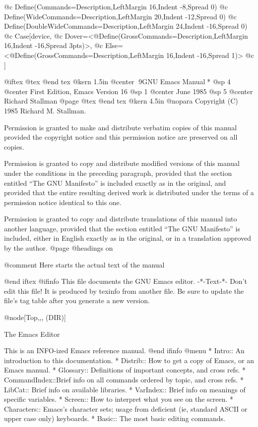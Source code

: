 @c Define(Commands=Description,LeftMargin 16,Indent -8,Spread 0)
@c Define(WideCommands=Description,LeftMargin 20,Indent -12,Spread 0)
@c Define(DoubleWideCommands=Description,LeftMargin 24,Indent -16,Spread 0)
@c Case[device,
@c Dover=<@Define(GrossCommands=Description,LeftMargin 16,Indent -16,Spread 3pts)>,
@c Else=<@Define(GrossCommands=Description,LeftMargin 16,Indent -16,Spread 1)>
@c ]

@iftex
@tex
\hbox{}
@end tex
@kern 1.5in
@center 9GNU Emacs Manual*
@sp 4
@center First Edition, Emacs Version 16
@sp 1
@center June 1985
@sp 5
@center Richard Stallman
@page
@tex
\hbox{}
@end tex
@kern 4.5in
@nopara
Copyright (C) 1985 Richard M. Stallman.

Permission is granted to make and distribute verbatim copies of
this manual provided the copyright notice and this permission notice
are preserved on all copies.

Permission is granted to copy and distribute modified versions of
this manual under the conditions in the preceding paragraph,
provided that the section entitled ``The GNU Manifesto''
is included exactly as in the original, and provided that
the entire resulting derived work is distributed under the terms of
a permission notice identical to this one.

Permission is granted to copy and distribute translations of this manual
into another language, provided that the section entitled ``The GNU
Manifesto'' is included, either in English exactly
as in the original, or in a translation approved by the author.
@page
@headings on

@comment Here starts the actual text of the manual

@end iftex
@ifinfo
This file documents the GNU Emacs editor.  -*-Text-*-
Don't edit this file! It is produced by texinfo from another file.
Be sure to update the file's tag table after you generate a new version.

@node[Top,,, (DIR)]

The Emacs Editor

This is an INFO-ized Emacs reference manual.
@end ifinfo
@menu
* Intro::       An introduction to this documentation.
* Distrib::	How to get a copy of Emacs, or an Emacs manual.
* Glossary::    Definitions of important concepts, and cross refs.
* CommandIndex::Brief info on all commands ordered by topic,
                and cross refs.
* LibCat::      Brief info on available libraries.
* VarIndex::    Brief info on meanings of specific variables.
* Screen::      How to interpret what you see on the screen.
* Characters::  Emacs's character sets;  usage from deficient
                (ie, standard ASCII or upper case only) keyboards.
* Basic::       The most basic editing commands.

